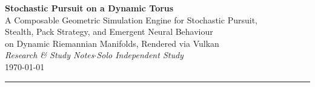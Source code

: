 

\begin{center}
  {\LARGE\bfseries\color{deepblue}
    Stochastic Pursuit on a Dynamic Torus}\\[0.6em]
  {\large\color{midblue}
    A Composable Geometric Simulation Engine for Stochastic Pursuit,\\[0.2em]
    Stealth, Pack Strategy, and Emergent Neural Behaviour\\[0.2em]
    on Dynamic Riemannian Manifolds, Rendered via Vulkan}\\[1.2em]
  {\normalsize\color{softgold}\itshape
    Research \& Study Notes\quad$\cdot$\quad Solo Independent Study}\\[0.4em]
  {\small\color{gray} \today}
\end{center}

\vspace{1.2em}
\noindent\rule{\linewidth}{0.8pt}
\vspace{0.6em}

